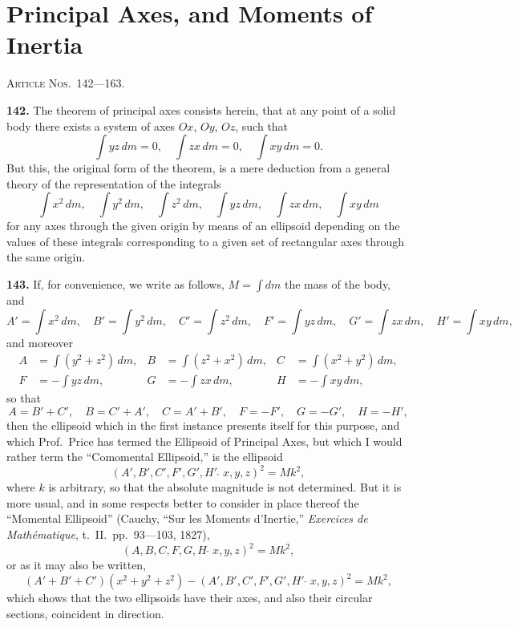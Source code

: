 \documentclass[11pt,a4paper]{book}
\begin{document}
\section*{Principal Axes, and Moments of Inertia}
\noindent\textsc{Article Nos.~142---163.}

\medskip

\textbf{142.} The theorem of principal axes consists herein, that at any point of a solid body there exists a system of axes $Ox$, $Oy$, $Oz$, such that
\[
\int yz\,dm = 0, \quad \int zx\,dm = 0, \quad \int xy\,dm = 0.
\]
But this, the original form of the theorem, is a mere deduction from a general theory of the representation of the integrals
\[
\int x^2\,dm, \quad \int y^2\,dm, \quad \int z^2\,dm, \quad \int yz\,dm, \quad \int zx\,dm, \quad \int xy\,dm
\]
for any axes through the given origin by means of an ellipsoid depending on the values of these integrals corresponding to a given set of rectangular axes through the same origin.

\textbf{143.} If, for convenience, we write as follows, $M = \int dm$ the mass of the body, and
\[
A' = \int x^2\,dm, \quad B' = \int y^2\,dm, \quad C' = \int z^2\,dm, \quad F' = \int yz\,dm, \quad G' = \int zx\,dm, \quad H' = \int xy\,dm,
\]
and moreover
\begin{align*}
A &= \int(y^2 + z^2)\,dm, & B &= \int(z^2 + x^2)\,dm, & C &= \int(x^2 + y^2)\,dm, \\
F &= -\int yz\,dm, & G &= -\int zx\,dm, & H &= -\int xy\,dm,
\end{align*}
so that
\[
A = B' + C', \quad B = C' + A', \quad C = A' + B', \quad F = -F', \quad G = -G', \quad H = -H',
\]
then the ellipsoid which in the first instance presents itself for this purpose, and which Prof.~Price has termed the Ellipsoid of Principal Axes, but which I would rather term the ``Comomental Ellipsoid,'' is the ellipsoid
\[
(A', B', C', F', G', H'\,\widehat{\,}\,x, y, z)^2 = Mk^2,
\]
where $k$ is arbitrary, so that the absolute magnitude is not determined. But it is more usual, and in some respects better to consider in place thereof the ``Momental Ellipsoid'' (Cauchy, ``Sur les Moments d'Inertie,'' \textit{Exercices de Math\'ematique}, t.~II.\ pp.~93---103, 1827),
\[
(A, B, C, F, G, H\,\widehat{\,}\,x, y, z)^2 = Mk^2,
\]
or as it may also be written,
\[
(A' + B' + C')(x^2 + y^2 + z^2) - (A', B', C', F', G', H'\,\widehat{\,}\,x, y, z)^2 = Mk^2,
\]
which shows that the two ellipsoids have their axes, and also their circular sections, coincident in direction.
\end{document}

